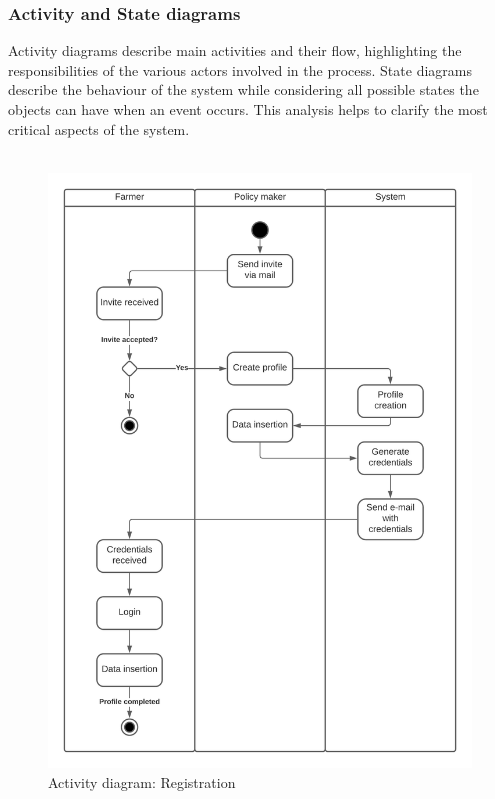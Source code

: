 \documentclass[10pt]{article}
\begin{document}
\subsubsection{Activity and State diagrams}
Activity diagrams describe main activities and their flow, highlighting the responsibilities of the various actors involved in the process.
State diagrams describe the behaviour of the system while considering all possible states the objects can have when an event occurs. 
This analysis helps to clarify the most critical aspects of the system.\\\\
\begin{figure}[ht!]
    \centering
    \includegraphics[scale=0.48]{stateDiagrams/Registration.png}
    \caption{Activity diagram: Registration}
    \label{fig:sd1}
\end{figure}
\end{document}

